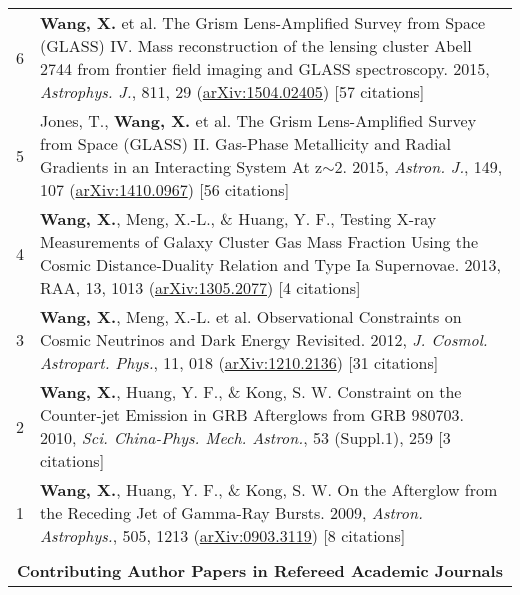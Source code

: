 \documentclass[letterpaper,10pt]{article}
\newcommand{\narrow}{-1.8ex}
\begin{document}
\begin{longtable}{rp{6.3in}}
6 &  \textbf{Wang, X.} et al. The Grism Lens-Amplified Survey from Space (GLASS) IV. Mass reconstruction of the lensing cluster Abell 2744 from frontier field imaging and GLASS spectroscopy. 2015, \textit{Astrophys. J.}, 811, 29 (\href{http://arxiv.org/abs/1504.02405}{arXiv:1504.02405}) [57 citations] \\

5 &  Jones, T., \textbf{Wang, X.} et al. The Grism Lens-Amplified Survey from Space (GLASS) II. Gas-Phase Metallicity and Radial Gradients in an Interacting System At z$\sim$2. 2015, \textit{Astron. J.}, 149, 107 (\href{http://arxiv.org/abs/1410.0967}{arXiv:1410.0967}) [56 citations] \\

4 &  \textbf{Wang, X.}, Meng, X.-L., \& Huang, Y. F., Testing X-ray Measurements of Galaxy Cluster Gas Mass Fraction Using the Cosmic Distance-Duality Relation and Type Ia Supernovae. 2013, RAA, 13, 1013 (\href{http://arxiv.org/abs/1305.2077}{arXiv:1305.2077}) [4 citations] \\

3 &  \textbf{Wang, X.}, Meng, X.-L. et al. Observational Constraints on Cosmic Neutrinos and Dark Energy Revisited. 2012, \textit{J. Cosmol.  Astropart. Phys.}, 11, 018 (\href{http://arxiv.org/abs/1210.2136}{arXiv:1210.2136}) [31 citations] \\

2 &  \textbf{Wang, X.}, Huang, Y. F., \& Kong, S. W. Constraint on the Counter-jet Emission in GRB Afterglows from GRB 980703. 2010, \textit{Sci.  China-Phys. Mech. Astron.}, 53 (Suppl.1), 259 [3 citations]    \\

1 &  \textbf{Wang, X.}, Huang, Y. F., \& Kong, S. W. On the Afterglow from the Receding Jet of Gamma-Ray Bursts. 2009, \textit{Astron. Astrophys.}, 505, 1213 (\href{http://arxiv.org/abs/0903.3119}{arXiv:0903.3119}) [8 citations]   \\

\\[\narrow]
\multicolumn{2}{c}{\textbf{Contributing Author Papers in Refereed Academic Journals}}      \\


\end{longtable}
\end{document}
